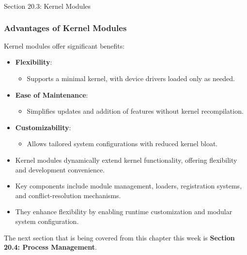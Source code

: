 \begin{notes}{Section 20.3: Kernel Modules}
    \subsubsection*{Advantages of Kernel Modules}
    
    Kernel modules offer significant benefits:
    \begin{itemize}
        \item \textbf{Flexibility}:
        \begin{itemize}
            \item Supports a minimal kernel, with device drivers loaded only as needed.
        \end{itemize}
        \item \textbf{Ease of Maintenance}:
        \begin{itemize}
            \item Simplifies updates and addition of features without kernel recompilation.
        \end{itemize}
        \item \textbf{Customizability}:
        \begin{itemize}
            \item Allows tailored system configurations with reduced kernel bloat.
        \end{itemize}
    \end{itemize}
    
    \begin{highlight}
        \begin{itemize}
            \item Kernel modules dynamically extend kernel functionality, offering flexibility and development convenience.
            \item Key components include module management, loaders, registration systems, and conflict-resolution mechanisms.
            \item They enhance flexibility by enabling runtime customization and modular system configuration.
        \end{itemize}
    \end{highlight}
\end{notes}

The next section that is being covered from this chapter this week is \textbf{Section 20.4: Process Management}.

